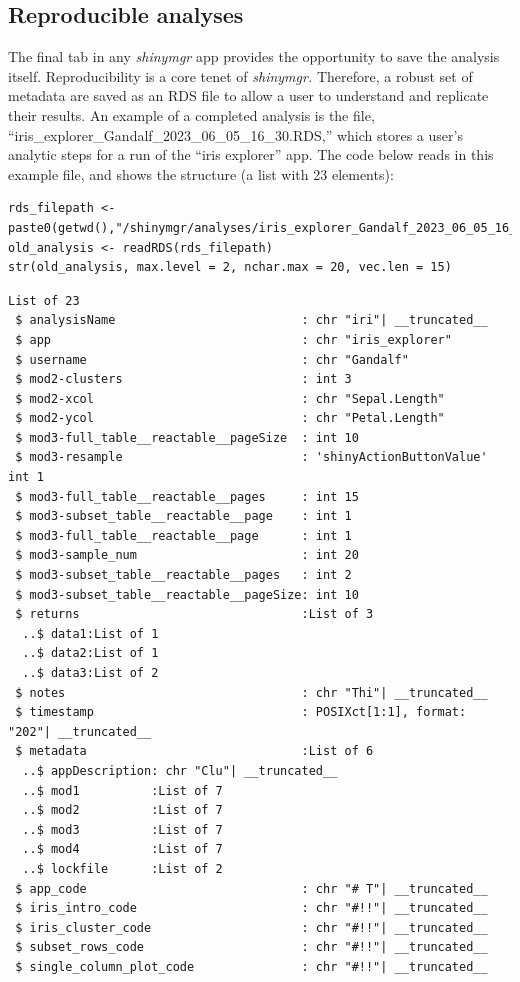 \subsection{Reproducible analyses}\label{reproducible-analyses}

The final tab in any \emph{shinymgr} app provides the opportunity to save the analysis itself. Reproducibility is a core tenet of \emph{shinymgr.} Therefore, a robust set of metadata are saved as an RDS file to allow a user to understand and replicate their results. An example of a completed analysis is the file, ``iris\_explorer\_Gandalf\_2023\_06\_05\_16\_30.RDS,'' which stores a user's analytic steps for a run of the ``iris explorer'' app. The code below reads in this example file, and shows the structure (a list with 23 elements):

\begin{verbatim}
rds_filepath <- paste0(getwd(),"/shinymgr/analyses/iris_explorer_Gandalf_2023_06_05_16_30.RDS")
old_analysis <- readRDS(rds_filepath)
str(old_analysis, max.level = 2, nchar.max = 20, vec.len = 15)
\end{verbatim}

\begin{verbatim}
List of 23
 $ analysisName                          : chr "iri"| __truncated__
 $ app                                   : chr "iris_explorer"
 $ username                              : chr "Gandalf"
 $ mod2-clusters                         : int 3
 $ mod2-xcol                             : chr "Sepal.Length"
 $ mod2-ycol                             : chr "Petal.Length"
 $ mod3-full_table__reactable__pageSize  : int 10
 $ mod3-resample                         : 'shinyActionButtonValue' int 1
 $ mod3-full_table__reactable__pages     : int 15
 $ mod3-subset_table__reactable__page    : int 1
 $ mod3-full_table__reactable__page      : int 1
 $ mod3-sample_num                       : int 20
 $ mod3-subset_table__reactable__pages   : int 2
 $ mod3-subset_table__reactable__pageSize: int 10
 $ returns                               :List of 3
  ..$ data1:List of 1
  ..$ data2:List of 1
  ..$ data3:List of 2
 $ notes                                 : chr "Thi"| __truncated__
 $ timestamp                             : POSIXct[1:1], format: "202"| __truncated__
 $ metadata                              :List of 6
  ..$ appDescription: chr "Clu"| __truncated__
  ..$ mod1          :List of 7
  ..$ mod2          :List of 7
  ..$ mod3          :List of 7
  ..$ mod4          :List of 7
  ..$ lockfile      :List of 2
 $ app_code                              : chr "# T"| __truncated__
 $ iris_intro_code                       : chr "#!!"| __truncated__
 $ iris_cluster_code                     : chr "#!!"| __truncated__
 $ subset_rows_code                      : chr "#!!"| __truncated__
 $ single_column_plot_code               : chr "#!!"| __truncated__
\end{verbatim}


